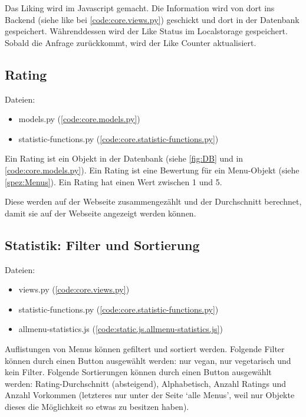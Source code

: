 Das Liking wird im Javascript gemacht. Die Information wird von dort ins Backend
(siehe like bei \ref{code:core.views.py}) geschickt und dort in der Datenbank
gespeichert. Währenddessen wird der Like Status im Localstorage gespeichert.
Sobald die Anfrage zurückkommt, wird der Like Counter aktualisiert.

\subsection{Rating} \label{spez:Rating}

Dateien:
\begin{itemize}
    \item models.py (\ref{code:core.models.py})
    \item statistic-functions.py (\ref{code:core.statistic-functions.py})
\end{itemize}

Ein Rating ist ein Objekt in der Datenbank (siehe \ref{fig:DB} und in
\ref{code:core.models.py}). Ein Rating ist eine Bewertung für ein Menu-Objekt
(siehe \ref{spez:Menus}). Ein Rating hat einen Wert zwischen 1 und 5.

Diese werden auf der Webseite zusammengezählt und der Durchschnitt berechnet,
damit sie auf der Webseite angezeigt werden können.


\subsection{Statistik: Filter und Sortierung} \label{spez:Statistik}

Dateien:
\begin{itemize}
    \item views.py (\ref{code:core.views.py})
    \item statistic-functions.py (\ref{code:core.statistic-functions.py})
    \item allmenu-statistics.js (\ref{code:static.js.allmenu-statistics.js})
\end{itemize}

Auflistungen von Menus können gefiltert und sortiert werden. Folgende Filter
können durch einen Button ausgewählt werden: nur vegan, nur vegetarisch und kein
Filter. Folgende Sortierungen können durch einen Button ausgewählt werden:
Rating-Durchschnitt (absteigend), Alphabetisch, Anzahl Ratings und Anzahl
Vorkommen (letzteres nur unter der Seite `alle Menus', weil nur 
Objekte dieses die Möglichkeit so etwas zu besitzen haben).

